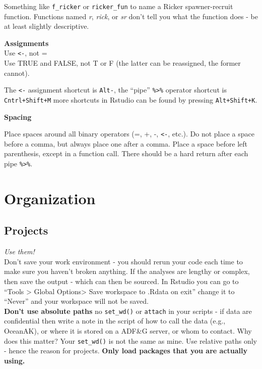 \documentclass[
]{article}
\begin{document}
Something like \texttt{f\_ricker} or \texttt{ricker\_fun} to name a
Ricker spawner-recruit function. Functions named \emph{r}, \emph{rick},
or \emph{sr} don't tell you what the function does - be at least
slightly descriptive.

\textbf{Assignments}\\
Use \texttt{\textless{}-}, not =\\
Use TRUE and FALSE, not T or F (the latter can be reassigned, the former
cannot).

The \texttt{\textless{}-} assignment shortcut is \texttt{Alt-}, the
``pipe'' \texttt{\%\textgreater{}\%} operator shortcut is
\texttt{Cntrl+Shift+M} more shortcuts in Rstudio can be found by
pressing \texttt{Alt+Shift+K}.

\textbf{Spacing}

Place spaces around all binary operators (=, +, -,
\texttt{\textless{}-}, etc.). Do not place a space before a comma, but
always place one after a comma. Place a space before left parenthesis,
except in a function call. There should be a hard return after each pipe
\texttt{\%\textgreater{}\%}.

\hypertarget{organization}{%
\section{Organization}\label{organization}}

\hypertarget{projects}{%
\subsection{Projects}\label{projects}}

\emph{Use them!}\\
Don't save your work environment - you should rerun your code each time
to make sure you haven't broken anything. If the analyses are lengthy or
complex, then save the output - which can then be sourced. In Rstudio
you can go to ``Tools \textgreater{} Global Options\textgreater{} Save
workspace to .Rdata on exit'' change it to ``Never'' and your workspace
will not be saved.\\
\textbf{Don't use absolute paths} no \texttt{set\_wd()} or
\texttt{attach} in your scripts - if data are confidential then write a
note in the script of how to call the data (e.g., OceanAK), or where it
is stored on a ADF\&G server, or whom to contact. Why does this matter?
Your \texttt{set\_wd()} is not the same as mine. Use relative paths only
- hence the reason for projects. \textbf{Only load packages that you are
actually using.}
\end{document}
